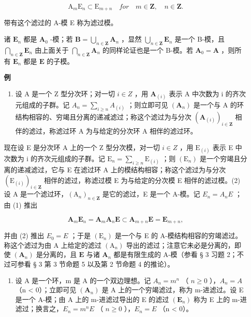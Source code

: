 \[
\mathrm{A} _ {m} \mathrm{E} _ {n} \subset \mathrm{E} _ {m + n} \quad for \quad m \in \mathbf {Z}, \quad n \in \mathbf {Z}.\tag{3}
\]

带有这个滤过的 A-模 E 称为滤过模。

诸 \(\mathbf{E}_n\) 都是 \(\mathbf{A}_0\) -模；若 \(\mathbf{B} = \bigcup_{n \in \mathbf{Z}} \mathbf{A}_n\) ，显然 \(\bigcup_{n \in \mathbf{Z}} \mathbf{E}_n\) 是一个 B-模，且 \(\bigcap_{n \in \mathbf{Z}} \mathbf{E}_n\) 由上面关于 \(\bigcap_{n \in \mathbf{Z}} \mathbf{A}_n\) 的同样论证也是一个 B-模。若 \(\mathbf{A}_0 = \mathbf{A}\) ，则所有 \(\mathbf{E}_n\) 都是 \(\mathbf{E}\) 的子模。

\textbf{例}\par

\begin{enumerate}
\def\labelenumi{(\arabic{enumi})}
\tightlist
\item
  设 A 是一个 Z 型分次环；对一切 \(i \in Z\) ，用 \(\mathbf{A}_{(i)}\) 表示 A 中次数为 i 的齐次元组成的子群。记 \(A_{n} = \sum_{i \geq n} A_{(i)}\) ；则立即可见 \((\mathbf{A}_{n})\) 是一个与 A 的环结构相容的、穷竭且分离的递减滤过；称这个滤过为与分次 \((\mathbf{A}_{(i)})_{i \in \mathbf{Z}}\) 相伴的滤过，称滤过环 A 为与给定的分次环 A 相伴的滤过环。
\end{enumerate}

现在设 E 是分次环 A 上的一个 Z 型分次模，对一切 \(i \in Z\) ，用 \(\mathrm{E}_{(i)}\) 表示 E 中次数为 i 的齐次元组成的子群。记 \(\mathrm{E}_{n} = \sum_{i \geqslant n} \mathrm{E}_{(i)}\) ；则 \((\mathrm{E}_{n})\) 是一个穷竭且分离的递减滤过，它与 E 在滤过环 A 上的模结构相容；称这个滤过为与分次 \((\mathrm{E}_{(i)})_{i \in \mathbf{Z}}\) 相伴的滤过，称滤过模 E 为与给定的分次模 E 相伴的滤过模。(2) 设 A 是一个滤过环，\((\mathrm{A}_{n})_{n \in \mathbf{Z}}\) 是它的滤过，E 是一个 A-模。记 \(E_{n} = A_{n}E\) ；由 (1) 推出

\[
\mathbf {A} _ {m} \mathbf {E} _ {n} = \mathbf {A} _ {m} \mathbf {A} _ {n} \mathbf {E} \subset \mathbf {A} _ {m + n} \mathbf {E} = \mathbf {E} _ {m + n},
\]

并由 (2) 推出 \(E_{0} = E\) ；于是 \((\mathrm{E}_{n})\) 是一个与 E 的 A-模结构相容的穷竭滤过。称这个滤过为由 A 上给定的滤过 \((\mathrm{A}_{n})\) 导出的滤过；注意它未必是分离的，即使 \((\mathbf{A}_n)\) 是分离的，且 \(\mathbf{E}\) 与诸 \(\mathbf{A}_n\) 都是有限生成的 A-模（参看 § 3 习题 2；不过可参看 § 3 第 3 节命题 5 以及第 2 节命题 4 的推论）。

\begin{enumerate}
\def\labelenumi{(\arabic{enumi})}
\setcounter{enumi}{2}
\tightlist
\item
  设 A 是一个环，m 是 A 的一个双边理想。记 \(A_{n} = m^{n}\) （ \(n \geqslant 0\) ），\(A_{n} = A\) （n \textless{} 0）；立即可见 \((\mathbf{A}_{n})\) 是 A 上的一个穷竭滤过，称为 m-进滤过。设 E 是一个 A-模；由 A 上的 m-进滤过导出的 E 的滤过 \((\mathbf{E}_{n})\) 称为 E 上的 m-进滤过；换言之，\(E_{n} = m^{n}E\) （ \(n \geqslant 0\) ），\(E_{n} = E\) （n \textless{} 0）。
\end{enumerate}

